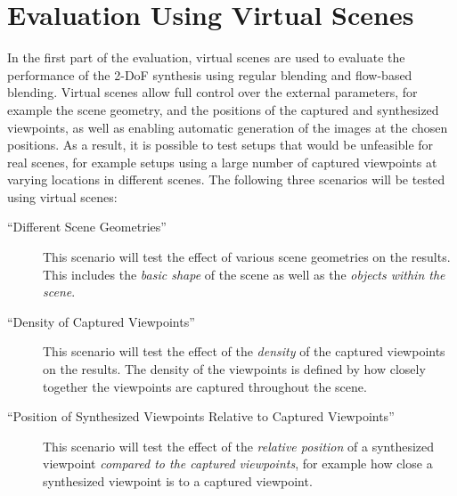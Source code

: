 \section{Evaluation Using Virtual Scenes} \label{sec:limit_eval}
In the first part of the evaluation, virtual scenes are used to evaluate the performance of the 2-DoF synthesis using regular blending and flow-based blending.
Virtual scenes allow full control over the external parameters, for example the scene geometry, and the positions of the captured and synthesized viewpoints, as well as enabling automatic generation of the images at the chosen positions.
As a result, it is possible to test setups that would be unfeasible for real scenes, for example setups using a large number of captured viewpoints at varying locations in different scenes.
The following three scenarios will be tested using virtual scenes:
\begin{description}
\item [``Different Scene Geometries''] This scenario will test the effect of various scene geometries on the results. This includes the \emph{basic shape} of the scene as well as the \emph{objects within the scene}.
\item [``Density of Captured Viewpoints''] This scenario will test the effect of the \emph{density} of the captured viewpoints on the results. The density of the viewpoints is defined by how closely together the viewpoints are captured throughout the scene.
\item [``Position of Synthesized Viewpoints Relative to Captured Viewpoints''] This scenario will test the effect of the \emph{relative position} of a synthesized viewpoint \emph{compared to the captured viewpoints}, for example how close a synthesized viewpoint is to a captured viewpoint.
\end{description}


